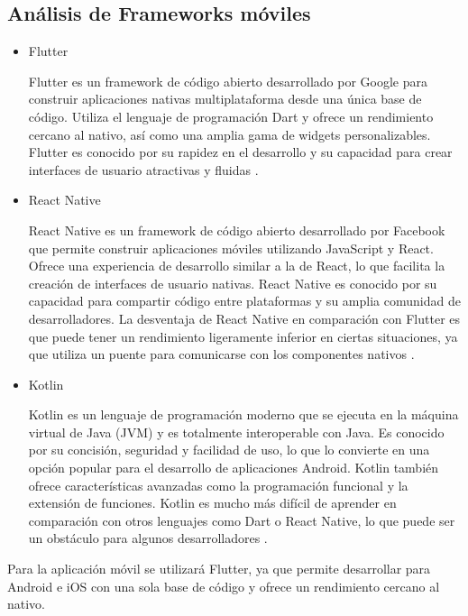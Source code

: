 \subsection{Análisis de Frameworks móviles}
\begin{itemize}
    \item Flutter
    
    Flutter es un framework de código abierto desarrollado por Google para construir aplicaciones nativas multiplataforma desde una única base de código. Utiliza el lenguaje
    de programación Dart y ofrece un rendimiento cercano al nativo, así como una amplia gama de widgets personalizables. Flutter es conocido por su rapidez en el desarrollo y 
    su capacidad para crear interfaces de usuario atractivas y fluidas \cite{WhyFlutter}.

    \item React Native

    React Native es un framework de código abierto desarrollado por Facebook que permite construir aplicaciones móviles utilizando JavaScript y React. Ofrece una experiencia 
    de desarrollo similar a la de React, lo que facilita la creación de interfaces de usuario nativas. React Native es conocido por su capacidad para compartir código entre 
    plataformas y su amplia comunidad de desarrolladores. La desventaja de React Native en comparación con Flutter es que puede tener un rendimiento ligeramente inferior en 
    ciertas situaciones, ya que utiliza un puente para comunicarse con los componentes nativos \cite{WhyReactNative}.

    \item Kotlin

    Kotlin es un lenguaje de programación moderno que se ejecuta en la máquina virtual de Java (JVM) y es totalmente interoperable con Java. Es conocido por su concisión, 
    seguridad y facilidad de uso, lo que lo convierte en una opción popular para el desarrollo de aplicaciones Android. Kotlin también ofrece características avanzadas como 
    la programación funcional y la extensión de funciones. Kotlin es mucho más difícil de aprender en comparación con otros lenguajes como Dart o React Native, 
    lo que puede ser un obstáculo para algunos desarrolladores \cite{WhyFlutter}.

\end{itemize}

Para la aplicación móvil se utilizará Flutter, ya que permite desarrollar para Android e iOS con una sola base de código y ofrece un rendimiento cercano al nativo.

